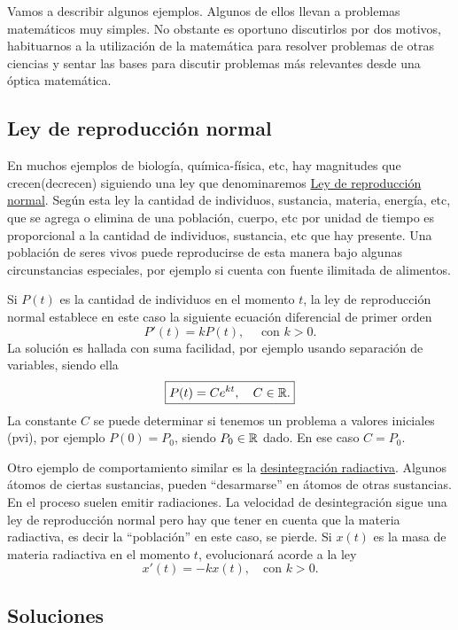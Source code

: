 Vamos a describir algunos ejemplos. Algunos de ellos llevan a problemas matemáticos muy simples. No obstante es oportuno discutirlos por dos motivos, habituarnos a la utilización de la matemática para resolver problemas de otras ciencias y sentar las bases para discutir problemas más relevantes desde una óptica matemática.

\subsection{Ley de reproducción normal}
  En muchos ejemplos de biología, química-física, etc, hay magnitudes que crecen(decrecen) siguiendo una ley que denominaremos
\href{http://es.wikipedia.org/wiki/Crecimiento_exponencial}{Ley de reproducción  normal}\link. Según esta ley la cantidad de individuos, sustancia, materia,
energía, etc, que se agrega o elimina de una población, cuerpo, etc por unidad de tiempo es proporcional a la cantidad de individuos, sustancia, etc que hay presente.   Una población de seres vivos puede reproducirse de esta manera bajo algunas circunstancias
especiales, por ejemplo si cuenta con fuente ilimitada de alimentos.

  Si $P(t)$ es la cantidad de individuos en el momento $t$, la ley de reproducción normal establece
en este caso la siguiente ecuación diferencial de primer orden
\[P'(t)=kP(t),\quad\text{ con } k>0.\]
La solución es hallada con suma facilidad, por ejemplo usando separación de variables, siendo ella
\[\boxed{P(t)=Ce^{kt},\quad C\in\rr.}\]
La constante  $C$ se puede determinar si tenemos un problema a valores iniciales (pvi), por ejemplo $P(0)=P_0$, siendo $P_0\in\rr$ dado. En ese caso
$C=P_0$.



  Otro ejemplo de comportamiento similar es la \href{http://es.wikipedia.org/wiki/Radiactividad}{desintegración radiactiva}\link. Algunos átomos de
ciertas sustancias, pueden ``desarmarse'' en átomos de otras sustancias. En el proceso suelen emitir radiaciones.  La velocidad de desintegración sigue una ley
de reproducción normal pero hay que tener en cuenta que la materia radiactiva, es decir la ``población''  en este caso, se pierde. Si $x(t)$ es la masa de materia radiactiva en el momento $t$, evolucionará
acorde a la ley
\[\boxed{x'(t)=-kx(t),\quad\text{con } k>0.}\]



\subsection{Soluciones}

